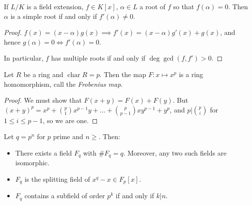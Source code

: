 \documentclass[a4paper, 10pt, twocolumn]{amsart}
\renewcommand{\charr}{\operatorname{char}}
\begin{document}
\begin{lemma}
If $L/K$ is a field extension, $f\in K[x]$, $\alpha\in L$ a root of $f$ so that $f(\alpha)=0$. Then $\alpha$ is a simple root if and only if $f'(\alpha) \neq 0$.
\end{lemma}
\begin{proof}
$f(x) = (x-\alpha)g(x) \implies f'(x) = (x-\alpha)g'(x) + g(x)$, and hence $g(\alpha)=0 \iff f'(\alpha) = 0$.

In particular, $f$ has multiple roots if and only if $\deg \gcd(f,f') > 0$.
\end{proof}
\begin{proposition}
Let $R$ be a ring and $\charr R = p$. Then the map $F:x \mapsto x^p$ is a ring homomorphism, call the \emph{Frobenius map}.
\end{proposition}
\begin{proof}
We must show that $F(x+y) = F(x) + F(y)$. But $(x+y)^p = x^p + \binom{p}{1} x^{p-1} y + \ldots + \binom{p}{p-1} xy^{p-1} + y^p$, and $p|\binom{p}{i}$ for $1\leq i\leq p-1$, so we are one.
\end{proof}
\begin{theorem}
Let $q=p^n$ for $p$ prime and $n\geq $. Then:
\begin{itemize}
\item There exists a field $F_q$ with $\#F_q = q$. Moreover, any two such fields are isomorphic.
\item $F_q$ is the splitting field of $x^q - x\in F_p[x]$.
\item $F_q$ contains a subfield of order $p^k$ if and only if $k|n$.
\end{itemize}
\end{theorem}
\end{document}

